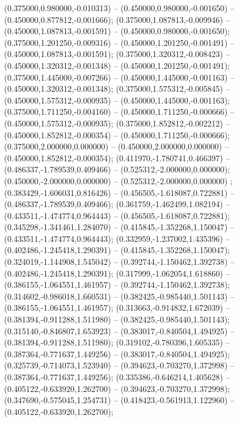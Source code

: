  (0.375000,0.980000,-0.010313) -- (0.450000,0.980000,-0.001650) -- (0.450000,0.877812,-0.001666);
 (0.375000,1.087813,-0.009946) -- (0.450000,1.087813,-0.001591) -- (0.450000,0.980000,-0.001650);
 (0.375000,1.201250,-0.009316) -- (0.450000,1.201250,-0.001491) -- (0.450000,1.087813,-0.001591);
 (0.375000,1.320312,-0.008423) -- (0.450000,1.320312,-0.001348) -- (0.450000,1.201250,-0.001491);
 (0.375000,1.445000,-0.007266) -- (0.450000,1.445000,-0.001163) -- (0.450000,1.320312,-0.001348);
 (0.375000,1.575312,-0.005845) -- (0.450000,1.575312,-0.000935) -- (0.450000,1.445000,-0.001163);
 (0.375000,1.711250,-0.004160) -- (0.450000,1.711250,-0.000666) -- (0.450000,1.575312,-0.000935);
 (0.375000,1.852812,-0.002212) -- (0.450000,1.852812,-0.000354) -- (0.450000,1.711250,-0.000666);
 (0.375000,2.000000,0.000000) -- (0.450000,2.000000,0.000000) -- (0.450000,1.852812,-0.000354);
 (0.411970,-1.780741,0.466397) -- (0.486337,-1.789539,0.409466) -- (0.525312,-2.000000,0.000000);
 (0.450000,-2.000000,0.000000) -- (0.525312,-2.000000,0.000000) ;
 (0.383429,-1.606031,0.816426) -- (0.456505,-1.618087,0.722881) -- (0.486337,-1.789539,0.409466);
 (0.361759,-1.462499,1.082194) -- (0.433511,-1.474774,0.964443) -- (0.456505,-1.618087,0.722881);
 (0.345298,-1.341461,1.284070) -- (0.415845,-1.352268,1.150047) -- (0.433511,-1.474774,0.964443);
 (0.332959,-1.237002,1.435396) -- (0.402486,-1.245418,1.290391) -- (0.415845,-1.352268,1.150047);
 (0.324019,-1.144908,1.545042) -- (0.392744,-1.150462,1.392738) -- (0.402486,-1.245418,1.290391);
 (0.317999,-1.062054,1.618860) -- (0.386155,-1.064551,1.461957) -- (0.392744,-1.150462,1.392738);
 (0.314602,-0.986018,1.660531) -- (0.382425,-0.985440,1.501143) -- (0.386155,-1.064551,1.461957);
 (0.313663,-0.914832,1.672039) -- (0.381394,-0.911288,1.511980) -- (0.382425,-0.985440,1.501143);
 (0.315140,-0.846807,1.653923) -- (0.383017,-0.840504,1.494925) -- (0.381394,-0.911288,1.511980);
 (0.319102,-0.780396,1.605335) -- (0.387364,-0.771637,1.449256) -- (0.383017,-0.840504,1.494925);
 (0.325739,-0.714073,1.523940) -- (0.394623,-0.703270,1.372998) -- (0.387364,-0.771637,1.449256);
 (0.335386,-0.646214,1.405628) -- (0.405122,-0.633920,1.262700) -- (0.394623,-0.703270,1.372998);
 (0.347690,-0.575045,1.254731) -- (0.418423,-0.561913,1.122960) -- (0.405122,-0.633920,1.262700);
